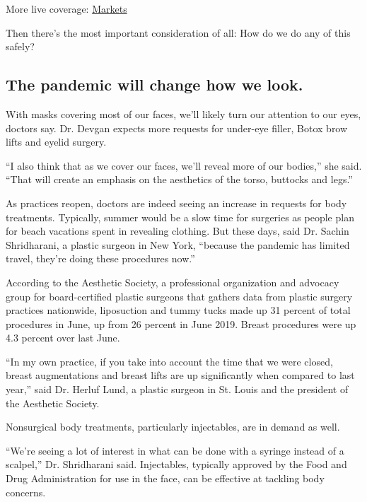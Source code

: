 More live coverage:
\href{https://www.nytimes3xbfgragh.onion/live/2020/09/08/business/stock-market-today-coronavirus?action=click\&pgtype=Article\&state=default\&region=MAIN_CONTENT_1\&context=storylines_live_updates}{Markets}

Then there's the most important consideration of all: How do we do any
of this safely?

\hypertarget{the-pandemic-will-change-how-we-look}{%
\subsection{The pandemic will change how we
look.}\label{the-pandemic-will-change-how-we-look}}

With masks covering most of our faces, we'll likely turn our attention
to our eyes, doctors say. Dr. Devgan expects more requests for under-eye
filler, Botox brow lifts and eyelid surgery.

``I also think that as we cover our faces, we'll reveal more of our
bodies,'' she said. ``That will create an emphasis on the aesthetics of
the torso, buttocks and legs.''

As practices reopen, doctors are indeed seeing an increase in requests
for body treatments. Typically, summer would be a slow time for
surgeries as people plan for beach vacations spent in revealing
clothing. But these days, said Dr. Sachin Shridharani, a plastic surgeon
in New York, ``because the pandemic has limited travel, they're doing
these procedures now.''

According to the Aesthetic Society, a professional organization and
advocacy group for board-certified plastic surgeons that gathers data
from plastic surgery practices nationwide, liposuction and tummy tucks
made up 31 percent of total procedures in June, up from 26 percent in
June 2019. Breast procedures were up 4.3 percent over last June.

``In my own practice, if you take into account the time that we were
closed, breast augmentations and breast lifts are up significantly when
compared to last year,'' said Dr. Herluf Lund, a plastic surgeon in St.
Louis and the president of the Aesthetic Society.

Nonsurgical body treatments, particularly injectables, are in demand as
well.

``We're seeing a lot of interest in what can be done with a syringe
instead of a scalpel,'' Dr. Shridharani said. Injectables, typically
approved by the Food and Drug Administration for use in the face, can be
effective at tackling body concerns.

